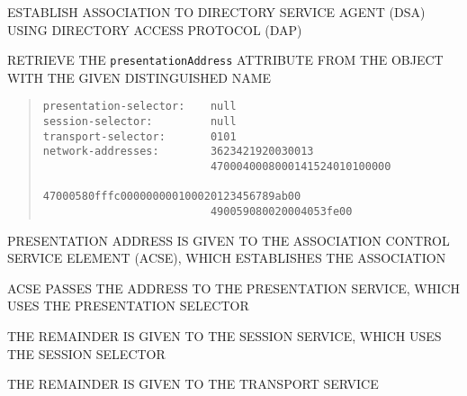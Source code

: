 \begin{bwslide}

\begin{nrtc}
\item	ESTABLISH ASSOCIATION TO DIRECTORY SERVICE AGENT (DSA)
	USING DIRECTORY ACCESS PROTOCOL (DAP)

\item	RETRIEVE THE \verb"presentationAddress" ATTRIBUTE FROM
	THE OBJECT WITH THE GIVEN DISTINGUISHED NAME
\end{nrtc}

\begin{quote}\small\begin{verbatim}
presentation-selector:    null
session-selector:         null
transport-selector:       0101
network-addresses:        3623421920030013
                          4700040008000141524010100000
                          47000580fffc000000000100020123456789ab00
                          490059080020004053fe00
\end{verbatim}\end{quote}
\end{bwslide}


\begin{bwslide}

\begin{nrtc}
\item	PRESENTATION ADDRESS IS GIVEN TO THE ASSOCIATION CONTROL SERVICE
	ELEMENT (ACSE), WHICH ESTABLISHES THE ASSOCIATION

\item	ACSE PASSES THE ADDRESS TO THE PRESENTATION SERVICE,
	WHICH USES THE PRESENTATION SELECTOR

\item	THE REMAINDER IS GIVEN TO THE SESSION SERVICE,
	WHICH USES THE SESSION SELECTOR

\item	THE REMAINDER IS GIVEN TO THE TRANSPORT SERVICE
\end{nrtc}
\end{bwslide}


